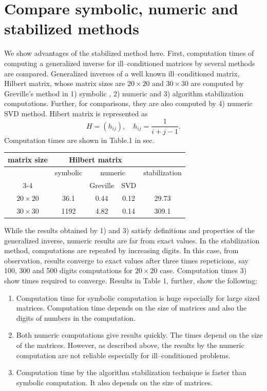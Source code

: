 \section{Compare symbolic, numeric and stabilized 
methods}

We show advantages of the stabilized method here.  
First, computation times of computing a generalized 
inverse for ill--conditioned matrices by several methods 
are compared.  Generalized inverses of a well known 
ill--conditioned matrix, Hilbert matrix, whose matrix 
sizes are $20 \times 20 $ and $30 \times 30 $ are 
computed by Greville's method in 1) symbolic , 
2) numeric and 3) algorithm stabilization computations.  
Further, for comparisons, they are also computed by 
4) numeric SVD method.
Hibert matrix is represented as
$$ H = \left( h_{ij} \right), \quad h_{ij} =
\frac{1}{i+j-1} . $$
Computation times are shown in Table.1 in sec.
\begin{center}
\begin{tabular}{|c||c|c|c|c|} \hline
matrix size & \multicolumn{3}{|c|}{Hilbert matrix} & \\ 
\hline
\multicolumn{1}{|c||}{} & symbolic & 
\multicolumn{2}{|c|}{numeric} & stabilization \\ \cline{3-4}
\multicolumn{1}{|c||}{} & \multicolumn{1}{|c|}{} & 
Greville & SVD & \multicolumn{1}{|c|}{} \\ \hline
$20 \times 20$ & 36.1 & 0.44 & 0.12 & 29.73 \\ \hline
$30 \times 30$ & 1192 & 4.82 & 0.14 & 309.1 \\ \hline
\end{tabular} 
\end{center}
While the results obtained by 1) and 3) satisfy definitions 
and properties of the generalized inverse, numeric 
results are far from exact values.  
In the stabilization method, computations are repeated by 
increasing digits.  In this case, from observation, results 
converge to exact values after three times repeticions, say 
100, 300 and 500 digits computations for $20 \times 20 $ case.  
Computation times 3) show times required to converge. 
Results in Table 1, further, show the following: 
\begin{enumerate}
\item Computation time for symbolic computation 
is huge especially for large sized matrices.  
Computation time depends on the size of matrices 
and also the digits of numbers in the computation.
\item Both numeric computations give results quickly.
The times depend on the size of the matrices.  However, 
as described above, the results by the 
numeric computation are not reliable especially for 
ill--conditioned problems.
\item Computation time by the algorithm stabilization 
technique is faster than symbolic computation.  It 
also depends on the size of matrices.
\end{enumerate}

